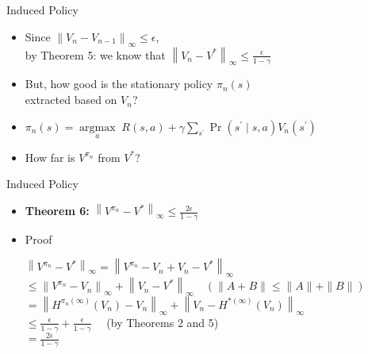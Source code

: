 \documentclass[11pt,table]{beamer}
\begin{document}
\begin{frame}{Induced Policy}

\begin{itemize}
    \item Since $\left\|V_{n}-V_{n-1}\right\|_{\infty} \leq \epsilon$,\\ by Theorem 5: we know that $\left\|V_{n}-V^{*}\right\|_{\infty} \leq \frac{\epsilon}{1-\gamma}$\\[2ex]

\item But, how good is the stationary policy $\pi_{n}(s)$\\ extracted based on $V_{n}$?\\[2ex]

\item $\pi_{n}(s)=\underset{a}{\operatorname{argmax}} \; R(s, a)+\gamma \sum_{s^{\prime}} \operatorname{Pr}\left(s^{\prime} \mid s, a\right) V_{n}\left(s^{\prime}\right)$\\[2ex]

\item How far is $V^{\pi_{n}}$ from $V^{*}$? 
\end{itemize}
    
\end{frame}

\begin{frame}{Induced Policy}
\vspace{-20mm}
    \begin{itemize}
        \item \textbf{Theorem 6:} \textcolor{red1}{$\left\|V^{\pi_{n}}-V^{*}\right\|_{\infty} \leq \frac{2 \epsilon}{1-\gamma}$}\\[2ex]

\pause

\item Proof

$\left\|V^{\pi_{n}}-V^{*}\right\|_{\infty}=\left\|V^{\pi_{n}}-V_{n}+V_{n}-V^{*}\right\|_{\infty}$\\[2ex]

$\leq\left\|V^{\pi_{n}}-V_{n}\right\|_{\infty}+\left\|V_{n}-V^{*}\right\|_{\infty} \quad(\|A+B\| \leq\|A\|+\|B\|)$\\[2ex]

$=\left\|H^{\pi_{n}(\infty)}\left(V_{n}\right)-V_{n}\right\|_{\infty}+\left\|V_{n}-H^{*(\infty)}\left(V_{n}\right)\right\|_{\infty}$\\[2ex]

$\leq \frac{\epsilon}{1-\gamma}+\frac{\epsilon}{1-\gamma} \quad$ (by Theorems 2 and 5)\\[2ex]

$=\frac{2 \epsilon}{1-\gamma}$ 
    \end{itemize}
\end{frame}
\end{document}
